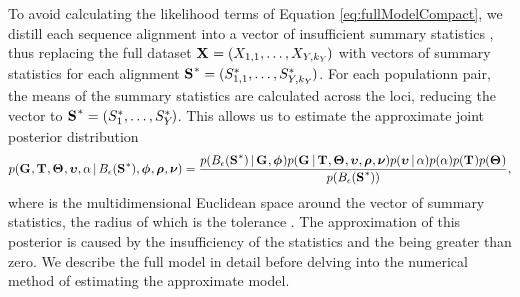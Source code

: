 \documentclass[letterpaper,12pt]{article}
\begin{document}
\begin{linenumbers}
\begin{linenomath}
To avoid calculating the likelihood terms of Equation \ref{eq:fullModelCompact},
we distill each sequence alignment \alignment{}{} into a vector of insufficient
summary statistics \alignmentSS{}{}, thus replacing the full dataset
$\alignmentVector = (\alignment{1}{1}, \ldots,
    \alignment{\npairs{}}{\nloci{\npairs{}}})$
with vectors of summary statistics for each alignment
$\ssVectorObs = (\alignmentSSObs{1}{1}, \ldots,
    \alignmentSSObs{\npairs{}}{\nloci{\npairs{}}})$.
For each populationn pair, the means of the summary statistics are calculated
across the \nloci{} loci, reducing the vector to
$\ssVectorObs = (\alignmentSSObs{1}{}, \ldots,
    \alignmentSSObs{\npairs{}}{})$.
This allows us to estimate the approximate joint posterior distribution
{\small
\begin{equation}
    p(\geneTreeVector, \divTimeMapVector, \demographicParamVector, 
    \locusMutationRateScalarVector, \locusRateHetShapeParameter \given
    \ssSpace, \hkyModelVector, \ploidyScalarVector,
    \mutationRateScalarConstantVector) =
    \frac{p(\ssSpace \given \geneTreeVector, \hkyModelVector)
        p(\geneTreeVector \given \divTimeMapVector, \demographicParamVector,
        \locusMutationRateScalarVector, \ploidyScalarVector,
        \mutationRateScalarConstantVector)
        p(\locusMutationRateScalarVector \given \locusRateHetShapeParameter)
        p(\locusRateHetShapeParameter)
        p(\divTimeMapVector)
        p(\demographicParamVector)}{
        p(\ssSpace)},
    \label{eq:approxModelCompact}
\end{equation}
}
where \ssSpace is the multidimensional Euclidean space around the vector of
summary statistics, the radius of which is the tolerance \tol.
The approximation of this posterior is caused by the insufficiency of the
statistics and the \tol being greater than zero.
We describe the full model in detail before delving into the numerical
method of estimating the approximate model.
\end{linenomath}


\end{linenumbers}
\end{document}
